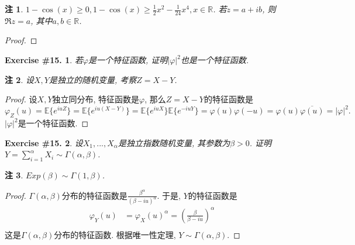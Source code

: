 \documentclass[UTF8, a4paper]{article}
\newtheorem{exercise}{Exercise \#15.}
\newtheorem*{remark}{注}
\begin{document}
\begin{remark}
\(1-\cos(x) \geq 0, 1-\cos(x) \geq \frac{1}{2}x^2 - \frac{1}{24}x^4, x\in \mathbb{R}\).
若\(z = a+ib\), 则\(\Re z = a\), 其中\(a, b \in \mathbb{R}\).
\end{remark}


\begin{proof}

\end{proof}




\begin{framed}
\begin{exercise}
若\(\varphi\)是一个特征函数, 证明\(|\varphi|^2\)也是一个特征函数.
\end{exercise}
\begin{remark}
设\(X,Y\)是独立的随机变量, 考察\(Z = X - Y\).
\end{remark}
\end{framed}

\begin{proof}
设\(X, Y\)独立同分布, 特征函数是\(\varphi\), 那么\(Z = X-Y\)的特征函数是
$$
\varphi_Z(u) = \mathbb{E}\{e^{i u Z}\} = \mathbb{E}\{e^{i u (X-Y)}\} = \mathbb{E}\{e^{i u X}\}\mathbb{E}\{e^{-i u Y}\} = \varphi(u)\varphi(-u) = \varphi(u)\overline{\varphi(u)} = |\varphi|^2.
$$
\(|\varphi|^2\)是一个特征函数.
\end{proof}

\begin{framed}
\begin{exercise}
设\(X_1, ..., X_\alpha\)是独立指数随机变量, 其参数为\(\beta > 0\).
证明\(Y = \sum_{i=1}^{\alpha} X_i \sim \Gamma(\alpha, \beta)\).
\end{exercise}
\end{framed}

\begin{remark}
\(Exp(\beta) \sim \Gamma(1, \beta)\).
\end{remark}

\begin{proof}
\(\Gamma(\alpha, \beta)\)分布的特征函数是\(\frac{\beta^\alpha}{(\beta - iu)^\alpha}\).
于是, \(Y\)的特征函数是
$$
\begin{aligned}
\varphi_Y(u) &= \varphi_X(u)^\alpha=  \left(\frac{\beta}{\beta - iu}\right)^\alpha \\
\end{aligned}
$$
这是\(\Gamma(\alpha, \beta)\)分布的特征函数. 根据唯一性定理, \(Y \sim \Gamma(\alpha, \beta)\).

\end{proof}





\end{document}
